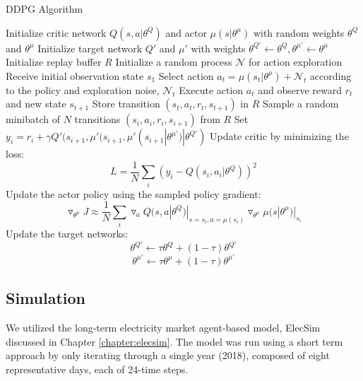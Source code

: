 \begin{algorithm}
	\caption{DDPG Algorithm \cite{Hunt2016a}}
	\begin{algorithmic}[1]
		\small
		\State Initialize critic network $Q(s,a|\theta^Q)$ and actor $\mu(s|\theta^\mu)$ with random weights $\theta^Q$ and $\theta^\mu$
		\State Initialize target network $Q'$ and $\mu'$ with weights $\theta^{Q'}\leftarrow\theta^Q,\theta^{\mu'}\leftarrow \theta^{\mu}$
		\State Initialize replay buffer $R$
		\State Initialize a random process $\mathcal{N}$ for action exploration
		\State Receive initial observation state $s_1$
		\State Select action $a_t=\mu(s_t|\theta^{\mu})+\mathcal{N}_t$ according to the policy and exploration noise, $\mathcal{N}_t$
		\State Execute action $a_t$ and observe reward $r_t$ and new state $s_{t+1}$
		\State Store transition $(s_t, a_t, r_t, s_{t+1})$ in $R$
		\State Sample a random minibatch of $N$ transitions $(s_i, a_i, r_i, s_{i+1})$ from $R$
		\State Set $y_i=r_i+\gamma Q'(s_{i+1},\mu'(s_{i+1},\mu'(s_{i+1}|\theta^{\mu'})|\theta^{Q'})$
		\State Update critic by minimizing the loss: $$L=\frac{1}{N}\sum_i(y_i-Q(s_i,a_i|\theta^Q))^2$$
		\State Update the actor policy using the sampled policy gradient: $$\triangledown_{\theta^\mu}J\approx \frac{1}{N}\sum_i\triangledown_a Q(s,a|\theta^Q)|_{s=s_i,a=\mu(s_i)}\triangledown_{\theta^\mu}\mu(s|\theta^\mu)|_{s_i}$$
		\State Update the target networks:
		$$\theta^{Q'}\leftarrow\tau\theta^Q+(1-\tau)\theta^{Q'}$$
		$$\theta^{\mu'}\leftarrow\tau\theta^\mu+(1-\tau)\theta^{\mu'}$$
		\EndFor
		\EndFor
	\end{algorithmic}
	\label{alg:ddpg}
\end{algorithm}

\subsection{Simulation}

We utilized the long-term electricity market agent-based model, ElecSim \cite{Kell,Kell2020} discussed in Chapter \ref{chapter:elecsim}. The model was run using a short term approach by only iterating through a single year (2018), composed of eight representative days, each of 24-time steps.





